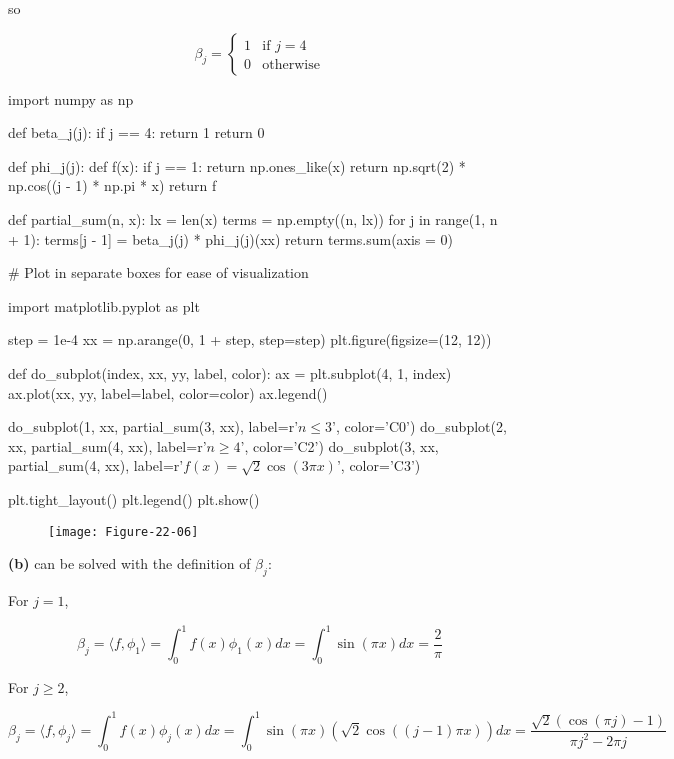 so

\[ \beta_{j} = \begin{cases}
1 & \text{if } j = 4 \\
0 & \text{otherwise}
\end{cases} \]

\begin{python}
import numpy as np

def beta_{j}(j):
    if j == 4:
        return 1
    return 0

def phi_{j}(j):
    def f(x):
        if j == 1:
            return np.ones_like(x)
        return np.sqrt(2) * np.cos((j - 1) * np.pi * x)
    return f

def partial_sum(n, x):
    lx = len(x)
    terms = np.empty((n, lx))
    for j in range(1, n + 1):
        terms[j - 1] = beta_{j}(j) * phi_{j}(j)(xx)
    return terms.sum(axis = 0)
\end{python}

\begin{python}
# Plot in separate boxes for ease of visualization

import matplotlib.pyplot as plt

step = 1e-4
xx = np.arange(0, 1 + step, step=step)
plt.figure(figsize=(12, 12))

def do_subplot(index, xx, yy, label, color):
    ax = plt.subplot(4, 1, index)
    ax.plot(xx, yy, label=label, color=color)
    ax.legend()    

do_subplot(1, xx, partial_sum(3,  xx), label=r'$n \leq 3$', color='C0')
do_subplot(2, xx, partial_sum(4,  xx), label=r'$n \geq 4$', color='C2')
do_subplot(3, xx, partial_sum(4,  xx), label=r'$f(x) = \sqrt{2} \cos (3 \pi x)$', color='C3')
    
plt.tight_layout()
plt.legend()
plt.show()
\end{python}

\begin{figure}[H]
\centering
\texttt{[image: Figure-22-06]}
\end{figure}

\textbf{(b)} can be solved with the definition of \(\beta_{j}\):

For \(j = 1\),

\[ \beta_{j} = \langle f, \phi_{1} \rangle = \int_{0}^{1} f(x) \phi_{1}(x) dx = \int_{0}^{1} \sin(\pi x) dx = \frac{2}{\pi} \]

For \(j \geq 2\),

\[
\beta_{j} = \langle f, \phi_{j} \rangle = \int_{0}^{1} f(x) \phi_{j}(x) dx = \int_{0}^{1} \sin(\pi x) \left( \sqrt{2} \cos((j-1) \pi x) \right) dx = \frac{\sqrt{2} (\cos(\pi j) - 1)}{\pi j^{2} - 2 \pi j }
\]

